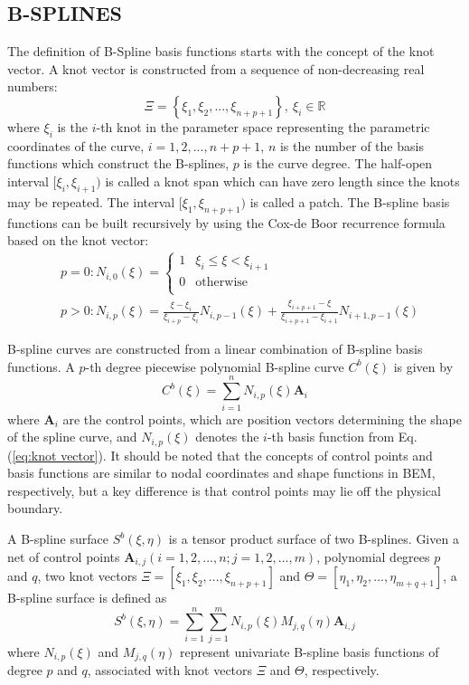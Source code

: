 \documentclass[review]{elsarticle}
\begin{document}
\subsection{B-SPLINES}
The definition of B-Spline basis functions starts with the concept of the knot vector. A knot vector is constructed from a sequence of non-decreasing real numbers:
\begin{equation}
\Xi=\left\{\xi_1,\xi_2,...,\xi_{n+p+1}\right\},\ \xi_i\in\mathbb{R}
\label{eq:knot}
\end{equation}
where $\xi_i$ is the $i$-th knot in the parameter space representing the parametric coordinates of the curve, $i = 1,2, . . . , n + p + 1$, $n$ is the number of the basis functions which construct the B-splines, $p$ is the curve degree. The half-open interval $[\xi_i,\xi_{i+1})$ is called a knot span which can have zero length since the knots may be repeated. The interval $[\xi_1,\xi_{n+p+1})$ is called a patch. The B-spline basis functions can be built recursively by using the Cox-de Boor recurrence formula \cite{Cox, Boor} based on the knot vector:
\begin{align}
&p=0:  N_{i,0}(\xi)=\left\{
\begin{array}{rcl}
1      &       {\xi_i\leq\xi <\xi_{i+1}}\\
0      &       \text{otherwise}\\
\end{array} \right.
\\
&p>0:  N_{i,p}(\xi)=\frac{\xi-\xi_{i}}{\xi_{i+p}-\xi_{i}} N_{i,p-1}(\xi)+\frac{\xi_{i+p+1}-\xi}{\xi_{i+p+1}-\xi_{i+1}} N_{i+1,p-1}(\xi)
\label{eq:knot vector}
\end{align}

B-spline curves \cite{Piegl,Rogers} are constructed from a linear combination of B-spline basis functions. A $p$-th degree piecewise polynomial B-spline curve $C^b(\xi)$ is given by
\begin{equation}
C^b(\xi)=\sum_{i=1}^{n}N_{i,p}(\xi)\mathbf{A}_i
\end{equation}
where ${\mathbf{A}_i}$ are the control points, which are position vectors determining the shape of the spline curve, and $N_{i,p}(\xi)$ denotes the $i$-th basis function from Eq. (\ref{eq:knot vector}). It should be noted that the concepts of control points and basis functions are similar to nodal coordinates and shape functions in BEM, respectively, but a key difference is that control points may lie off the physical boundary.

A B-spline surface $S^b(\xi,\eta)$ is a tensor product surface of two B-splines. Given a net of control points $\mathbf{A}_{i,j}(i=1,2,...,n;j=1,2,...,m)$, polynomial degrees $p$ and $q$, two knot vectors $\Xi=[\xi_1,\xi_2,...,\xi_{n+p+1}]$ and $\varTheta=[\eta_1,\eta_2,...,\eta_{m+q+1}]$, a B-spline surface is defined as
\begin{equation}
S^b(\xi,\eta)=\sum_{i=1}^{n}\sum_{j=1}^{m}N_{i,p}(\xi)M_{j,q}(\eta)\mathbf{A}_{i,j}
\label{eq:B-spline surface}
\end{equation}
where $N_{i,p}(\xi)$ and $M_{j,q}(\eta)$ represent univariate B-spline basis functions of degree $p$ and $q$, associated with knot vectors $\Xi$ and $\varTheta$, respectively.
\end{document}
